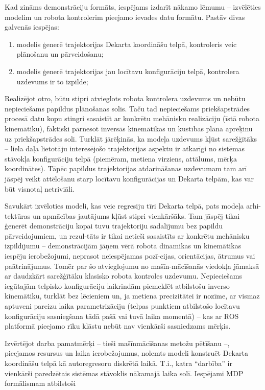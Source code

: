 \documentclass[12pt, a4paper]{article}
\numberwithin{equation}{section} %
\begin{document}
Kad zināms demonstrāciju formāts, iespējams izdarīt nākamo lēmumu -- izvēlēties modelim un robota kontrolerim pieejamo ievades datu formātu. Pastāv divas galvenās iespējas:

\begin{enumerate}
    \item modelis ģenerē trajektorijas Dekarta koordināšu telpā, kontroleris veic plānošanu un pārveidošanu;
    \item modelis ģenerē trajektorijas jau locītavu konfigurāciju telpā, kontrolera uzdevums ir to izpilde;
\end{enumerate}

Realizējot otro, būtu stipri atvieglots robota kontrolera uzdevums un nebūtu nepieciešams papildus plānošanas solis. Taču tad nepieciešams priekšapstrādes procesā datu kopu stingri sasaistīt ar konkrētu mehānisku realizāciju (īstā robota kinemātiku), faktiski pārnesot inversās kinemātikas un kustības plāna aprēķinu uz priekšapstrādes soli. Turklāt jārēķinās, ka modeļa uzdevums kļūst sarežģītāks -- liela daļa lietotāju interesējošo trajektorijas aspektu ir atkarīgi no sistēmas stāvokļa konfigurāciju telpā (piemēram, metiena virziens, attālums, mērķa koordinātes). Tāpēc papildus trajektorijas atdarināšanas uzdevumam tam arī jāspēj veikt attēlošanu starp locītavu konfigurācijas un Dekarta telpām, kas var būt visnotaļ netriviāli.  

Savukārt izvēloties modeli, kas veic regresiju tīri Dekarta telpā, pats modeļa arhi-tektūras un apmācības jautājums kļūst stipri vienkāršāks. Tam jāspēj tikai ģenerēt demonstrāciju kopai tuvu trajektoriju sadalījumu bez papildu pārveidojumiem, un rezul-tāts ir tikai netieši sasaistīts ar konkrētu mehānisku izpildījumu -- demonstrācijām jāņem vērā robota dinamikas un kinemātikas iespēju ierobežojumi, neprasot neiespējamas pozī-cijas, orientācijas, ātrumus vai paātrinājumus. Tomēr par šo atvieglojumu no mašīn-mācīšanās viedokļa jāmaksā ar daudzkārt sarežģītāku klasisko robota kontroles uzdevumu. Nepieciešams iegūtajām telpisko konfigurāciju laikrindām piemeklēt atbilstošu inverso kinemātiku, turklāt bez lēcieniem un, ja metiena precizitātei ir nozīme, ar vismaz aptuveni pareizu laika parametrizāciju (telpas punktiem atbilstošo locītavu konfigurāciju sasniegšana tādā pašā vai tuvā laika momentā) -- kas ar ROS platformā pieejamo rīku klāstu nebūt nav vienkārši sasniedzams mērķis.

Izvērtējot darba pamatmērķi -- tieši mašīnmācīšanas metožu pētīšanu --, pieejamos resursus un laika ierobežojumus, nolemts modeli konstruēt Dekarta koordināšu telpā kā autoregresoru diskrētā laikā. T.i., katra ``darbība'' ir vienkārši paredzētais sistēmas stāvoklis nākamajā laika solī. Iespējami MDP formālismam atbilstoši
\end{document}
